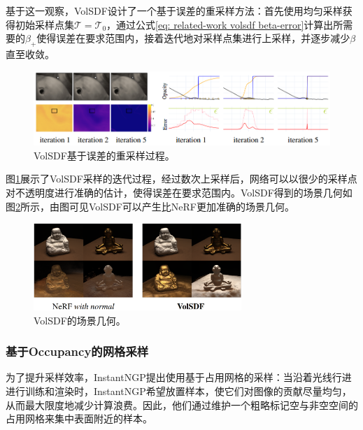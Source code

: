 基于这一观察，VolSDF设计了一个基于误差的重采样方法：首先使用均匀采样获得初始采样点集$\mathcal{T}=\mathcal{T}_0$，通过公式\ref{eq: related-work volsdf beta-error}计算出所需要的$\beta_+$使得误差在要求范围内，接着迭代地对采样点集进行上采样，并逐步减少$\beta$直至收敛。

\begin{figure}[ht]
    \centering
    \includegraphics[width=\textwidth]{undergraduate-thesis/images/related-work/volsdf-sampling.png}
    \caption{VolSDF\cite{yariv_volume_2021}基于误差的重采样过程。}
    \label{fig:related-work volsdf-sampling}
\end{figure}

图\ref{fig:related-work volsdf-sampling}展示了VolSDF采样的迭代过程，经过数次上采样后，网络可以以很少的采样点对不透明度进行准确的估计，使得误差在要求范围内。VolSDF得到的场景几何如图\ref{fig:related-work volsdf-result}所示，由图可见VolSDF可以产生比NeRF更加准确的场景几何。

\begin{figure}[ht]
    \centering
    \includegraphics[width=0.7\textwidth]{undergraduate-thesis/images/related-work/volsdf-result.png}
    \caption{VolSDF\cite{yariv_volume_2021}的场景几何。}
    \label{fig:related-work volsdf-result}
\end{figure}



\subsubsection{基于Occupancy的网格采样}
为了提升采样效率，InstantNGP\cite{muller_instant_2022}提出使用基于占用网格的采样：当沿着光线行进进行训练和渲染时，InstantNGP希望放置样本，使它们对图像的贡献尽量均匀，从而最大限度地减少计算浪费。因此，他们通过维护一个粗略标记空与非空空间的占用网格来集中表面附近的样本。

